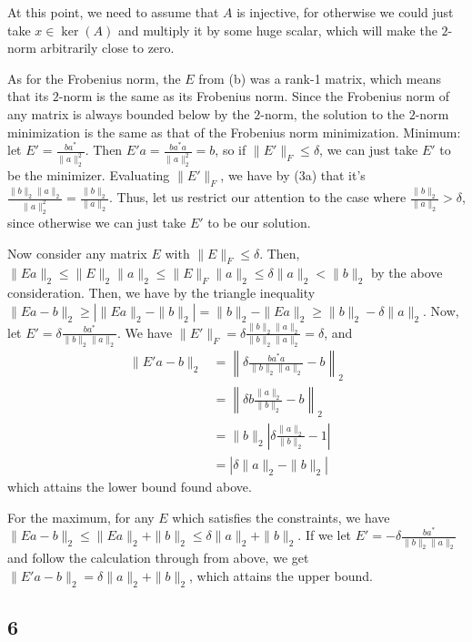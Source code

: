 \documentclass{article}
\begin{document}
At this point, we need to assume that $A$ is injective, for otherwise we could just take $x\in\ker(A)$ and multiply it by some huge scalar, which will make the $2$-norm arbitrarily close to zero. 

As for the Frobenius norm, the $E$ from (b) was a rank-1 matrix, which means that its $2$-norm is the same as its Frobenius norm. Since the Frobenius norm of any matrix is always bounded below by the $2$-norm, the solution to the $2$-norm minimization is the same as that of the Frobenius norm minimization.
Minimum: let $E'=\frac{ba^*}{\|a\|_2^2}$. Then $E'a=\frac{ba^*a}{\|a\|_2^2}=b$, so if $\|E'\|_F\leq\delta$, we can just take $E'$ to be the minimizer. Evaluating $\|E'\|_F$, we have by (3a) that it's $\frac{\|b\|_2\|a\|_2}{\|a\|_2^2}=\frac{\|b\|_2}{\|a\|_2}$. Thus, let us restrict our attention to the case where $\frac{\|b\|_2}{\|a\|_2}>\delta$, since otherwise we can just take $E'$ to be our solution.

Now consider any matrix $E$ with $\|E\|_F\leq\delta$. Then, $\|Ea\|_2\leq\|E\|_2\|a\|_2\leq\|E\|_F\|a\|_2\leq\delta\|a\|_2<\|b\|_2$ by the above consideration. Then, we have by the triangle inequality $\|Ea-b\|_2\geq\left|\|Ea\|_2-\|b\|_2\right|=\|b\|_2-\|Ea\|_2\geq\|b\|_2-\delta\|a\|_2$. Now, let $E'=\delta\frac{ba^*}{\|b\|_2\|a\|_2}$. We have $\|E'\|_F=\delta\frac{\|b\|_2\|a\|_2}{\|b\|_2\|a\|_2}=\delta$, and
\begin{align*}
    \|E'a-b\|_2&=\left\|\delta\frac{ba^*a}{\|b\|_2\|a\|_2}-b\right\|_2\\
              &=\left\|\delta b\frac{\|a\|_2}{\|b\|_2}-b\right\|_2\\
              &=\|b\|_2\left|\delta\frac{\|a\|_2}{\|b\|_2}-1\right|\\
              &=\left|\delta\|a\|_2-\|b\|_2\right|
\end{align*}
which attains the lower bound found above.

For the maximum, for any $E$ which satisfies the constraints, we have $\|Ea-b\|_2\leq\|Ea\|_2+\|b\|_2\leq\delta\|a\|_2+\|b\|_2$. If we let $E'=-\delta\frac{ba^*}{\|b\|_2\|a\|_2}$ and follow the calculation through from above, we get $\|E'a-b\|_2=\delta\|a\|_2+\|b\|_2$, which attains the upper bound.
\subsection*{6}
\end{document}
